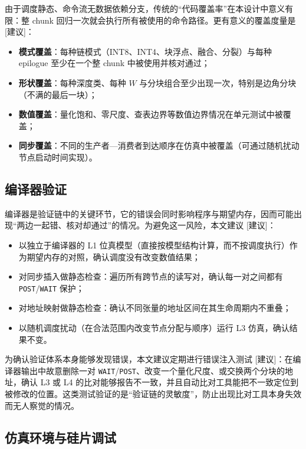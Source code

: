 \documentclass[a4paper,10.5pt]{ctexart}
\newcommand{\tR}{\textsf{[建议]}}           %
\begin{document}
由于调度静态、命令流无数据依赖分支，传统的“代码覆盖率”在本设计中意义有限：整 chunk 回归一次就会执行所有被使用的命令路径。更有意义的覆盖度量是 \tR：
\begin{itemize}
  \item \textbf{模式覆盖}：每种链模式（INT8、INT4、块浮点、融合、分裂）与每种 epilogue 至少在一个整 chunk 中被使用并核对通过；
  \item \textbf{形状覆盖}：每种深度类、每种 $W$ 与分块组合至少出现一次，特别是边角分块（不满的最后一块）；
  \item \textbf{数值覆盖}：量化饱和、零尺度、查表边界等数值边界情况在单元测试中被覆盖；
  \item \textbf{同步覆盖}：不同的生产者—消费者到达顺序在仿真中被覆盖（可通过随机扰动节点启动时间实现）。
\end{itemize}

\subsection{编译器验证}

编译器是验证链中的关键环节，它的错误会同时影响程序与期望内存，因而可能出现“两边一起错、核对却通过”的情况。为避免这一风险，本文建议 \tR：
\begin{itemize}
  \item 以独立于编译器的 L1 位真模型（直接按模型结构计算，而不按调度执行）作为期望内存的对照，确认调度没有改变数值结果；
  \item 对同步插入做静态检查：遍历所有跨节点的读写对，确认每一对之间都有 \texttt{POST}/\texttt{WAIT} 保护；
  \item 对地址映射做静态检查：确认不同张量的地址区间在其生命周期内不重叠；
  \item 以随机调度扰动（在合法范围内改变节点分配与顺序）运行 L3 仿真，确认结果不变。
\end{itemize}

为确认验证体系本身能够发现错误，本文建议定期进行错误注入测试 \tR：在编译器输出中故意删除一对 \texttt{WAIT}/\texttt{POST}、改变一个量化尺度、或交换两个分块的地址，确认 L3 或 L4 的比对能够报告不一致，并且自动比对工具能把不一致定位到被修改的位置。这类测试验证的是“验证链的灵敏度”，防止出现比对工具本身失效而无人察觉的情况。

\subsection{仿真环境与硅片调试}
\end{document}

